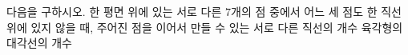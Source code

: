 다음을 구하시오.
 한 평면 위에 있는 서로 다른 $7$개의 점 중에서 어느 세 점도 한 직선 위에 있지 않을 때, 주어진 점을 이어서 만들 수 있는 서로 다른 직선의 개수
 육각형의 대각선의 개수
